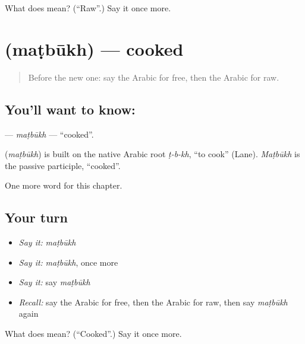 \begin{tcolorbox}[breakable,colback=teal!4,colframe=teal!35!black,title={Before you move on}]
What does  mean? (\textquotedblleft{}Raw\textquotedblright{}.) Say it once more.
\end{tcolorbox}
\section[\texorpdfstring{\ar{مطبوخ} (maṭbūkh)}{مطبوخ (maṭbūkh)}]{ (maṭbūkh) — cooked}

\label{lesson:AR-C177-matbukh}



\begin{quote}
Before the new one: say the Arabic for free, then the Arabic for raw.
\end{quote}

\subsection*{You'll want to know: }
\textbf{} — \emph{maṭbūkh} — \textquotedblleft{}cooked\textquotedblright{}.

\begin{cousinweb}
\textbf{} (\emph{maṭbūkh}) is built on the native Arabic root \emph{ṭ-b-kh}, \textquotedblleft{}to cook\textquotedblright{} (Lane). \emph{Maṭbūkh} is the passive participle, \textquotedblleft{}cooked\textquotedblright{}.
\end{cousinweb}

\begin{grammarlens}[title={What you've built}]
One more word for this chapter.
\end{grammarlens}

\subsection*{Your turn}
\begin{itemize}
\raggedright
  \item \emph{Say it:} \emph{maṭbūkh}
  \item \emph{Say it:} \emph{maṭbūkh}, once more
  \item \emph{Say it:} say \emph{maṭbūkh}
  \item \emph{Recall:} say the Arabic for free, then the Arabic for raw, then say \emph{maṭbūkh} again
\end{itemize}

\begin{tcolorbox}[breakable,colback=teal!4,colframe=teal!35!black,title={Before you move on}]
What does  mean? (\textquotedblleft{}Cooked\textquotedblright{}.) Say it once more.
\end{tcolorbox}
